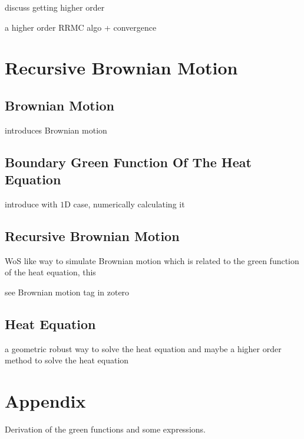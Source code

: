 \documentclass[a4paper,12pt]{article}
\begin{document}
discuss getting higher order

\begin{example}
    a higher order RRMC algo + convergence
\end{example}


\section{Recursive Brownian Motion}

\subsection{Brownian Motion}
introduces Brownian motion

\subsection{Boundary Green Function Of The Heat Equation}
introduce with $1$D case, numerically calculating it

\subsection{Recursive Brownian Motion}
WoS like way to simulate Brownian motion which is related to the green function
of the heat equation, this

\begin{related}
    see Brownian motion tag in zotero
\end{related}

\subsection{Heat Equation}
a geometric robust way to solve the heat equation and maybe a higher order method to solve
the heat equation



\newpage
\printbibliography
\newpage

\section{Appendix}
Derivation of the green functions and some expressions.
\end{document}

